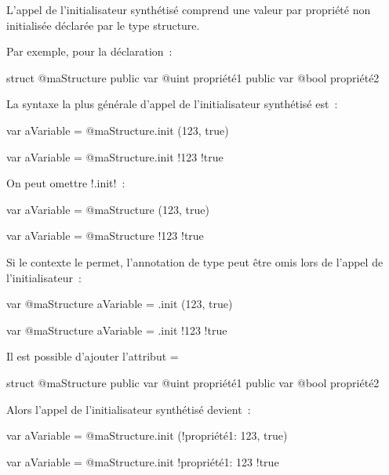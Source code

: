 L'appel de l'initialisateur synthétisé comprend une valeur par propriété non initialisée déclarée par le type structure.

Par exemple, pour la déclaration~:
\begin{galgas34}
struct @maStructure {
  public var @uint propriété1
  public var @bool propriété2
}
\end{galgas34}

La syntaxe la plus générale d'appel de l'initialisateur synthétisé est~:
\begin{galgas34}
var aVariable = @maStructure.init (123, true)
\end{galgas34}
\begin{galgas3}
var aVariable = @maStructure.init {!123 !true}
\end{galgas3}

On peut omettre \ggsq!.init!~:
\begin{galgas34}
var aVariable = @maStructure (123, true)
\end{galgas34}
\begin{galgas3}
var aVariable = @maStructure {!123 !true}
\end{galgas3}


Si le contexte le permet, l'annotation de type peut être omis lors de l'appel de l'initialisateur~:
\begin{galgas34}
var @maStructure aVariable = .init (123, true)
\end{galgas34}
\begin{galgas3}
var @maStructure aVariable = .init {!123 !true}
\end{galgas3}


Il est possible d'ajouter l'attribut \ggsq=%
\begin{galgas3}
struct @maStructure {
  public var @uint propriété1 %
  public var @bool propriété2
}
\end{galgas3}

Alors l'appel de l'initialisateur synthétisé devient~:
\begin{galgas4}
var aVariable = @maStructure.init (!propriété1: 123, true)
\end{galgas4}
\begin{galgas3}
var aVariable = @maStructure.init {!propriété1: 123 !true}
\end{galgas3}

